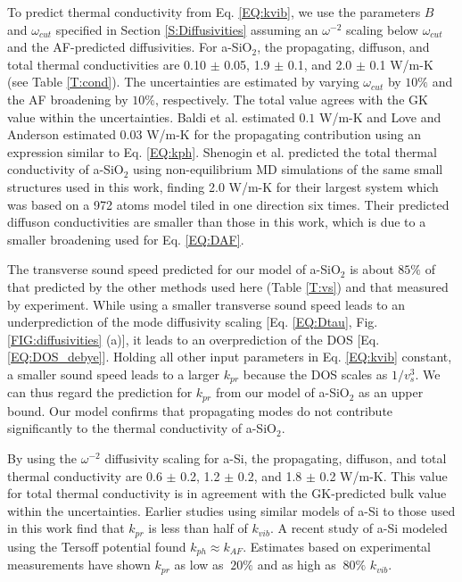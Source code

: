 \documentclass[aps,prb,twocolumn,superscriptaddress,footinbib,amsmath,amssymb,floatfix]{revtex4}
\begin{document}
To predict thermal conductivity from Eq. \eqref{EQ:kvib}, 
we use the parameters $B$ and $\omega_{cut}$ specified 
in Section \ref{S:Diffusivities} assuming an $\omega^{-2}$ 
scaling below $\omega_{cut}$ and the AF-predicted diffusivities. 
For a-SiO$_2$, the propagating, diffuson, and total thermal 
conductivities are 0.10 $\pm$ 0.05, 1.9 $\pm$ 0.1, 
and 2.0 $\pm$ 0.1 W/m-K (see Table \ref{T:cond}). The uncertainties 
are estimated by varying $\omega_{cut}$ by $10\%$ and the AF 
broadening by $10\%$, respectively.  
The total value agrees with the GK value within the uncertainties. 
Baldi et al. estimated $0.1$ W/m-K 
\cite{baldi_thermal_2008} and Love and Anderson estimated 0.03 
W/m-K\cite{love_estimate_1990} for the propagating contribution 
using an expression similar to Eq. \eqref{EQ:kph}.
Shenogin et al. predicted the total thermal 
conductivity of a-SiO$_2$ using 
non-equilibrium MD simulations of the same small structures 
used in this work, finding 2.0 W/m-K for their 
largest system which was based on a 972 atoms model 
tiled in one direction six times.\cite{shenogin_predicting_2009} 
Their predicted diffuson conductivities are smaller than those  
in this work, which is due to a smaller broadening used for 
Eq. \eqref{EQ:DAF}.  

The transverse sound speed predicted for our model of 
a-SiO$_2$ is about $85\%$ of that predicted by 
the other methods used here (Table \ref{T:vs}) and that 
measured by experiment.
\cite{vacher_ultrasonic_1981,benassi_evidence_1996,
ruocco_high-frequency_2001,polian_elastic_2002,
ruzicka_evidence_2004} 
While using a smaller transverse sound speed 
leads to an underprediction of the 
mode diffusivity scaling [Eq. \eqref{EQ:Dtau},
Fig. \ref{FIG:diffusivities} (a)], it leads to an 
overprediction of the DOS [Eq. \eqref{EQ:DOS_debye}]. 
Holding all other input parameters in Eq. \eqref{EQ:kvib} constant, 
a smaller sound speed leads to a larger $k_{pr}$ 
because the DOS scales as 
$1/v^3_{s}$. We can thus regard 
the prediction for $k_{pr}$ from 
our model of a-SiO$_2$ as an upper bound. 
Our model confirms that propagating modes do not contribute 
significantly to the thermal conductivity of a-SiO$_2$.

By using the $\omega^{-2}$ diffusivity scaling for a-Si, 
the propagating, diffuson, and total thermal conductivity are 
0.6 $\pm$ 0.2, 1.2 $\pm$ 0.2, and 1.8 $\pm$ 0.2 W/m-K. 
This value for total thermal conductivity 
is in agreement with the GK-predicted bulk value within the 
uncertainties. Earlier studies using 
similar models of a-Si to those used in this work find 
that $k_{pr}$ is less than half of 
$k_{vib}$.\cite{feldman_thermal_1993,
feldman_numerical_1999} 
A recent study of a-Si modeled using the Tersoff potential found 
$k_{ph} \approx k_{AF}$.\cite{he_heat_2011} 
Estimates based on experimental measurements 
have shown $k_{pr}$ as low as 
$~20\%$\cite{cahill_thermal_1994,feldman_numerical_1999} 
and as high as $~80\%$ $k_{vib}$.
\cite{liu_high_2009,yang_anomalously_2010}
\end{document}
